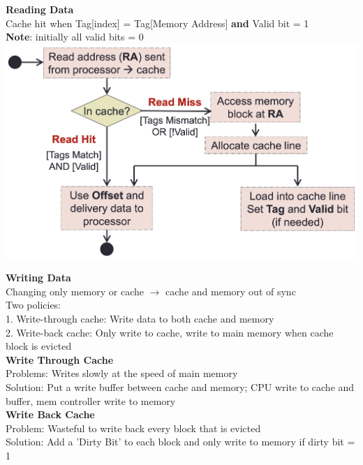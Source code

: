 \documentclass[10pt, a4paper]{article}
\newcommand{\highlight}[1]{{\color{red}\textbf{#1}}}
\newcommand{\red}[1]{{\color{red}#1}}
\newcommand{\green}[1]{{\color{ForestGreen}#1}}
\begin{document}
\begin{multicols*}{3}
		\textbf{Reading Data}\\
		Cache hit when Tag[index] = Tag[Memory Address] \highlight{and}
		Valid bit = 1\\
		\highlight{Note}: initially all valid bits = 0\\
		\includegraphics[scale=.22]{./assets/readCacheData}

		\textbf{Writing Data}\\
		Changing only memory or cache $\rightarrow$ cache and memory out of sync\\
		Two policies:\\
		1. Write-through cache: Write data to both cache and memory\\
		2. Write-back cache: Only write to cache, write to main memory when cache block is evicted\\

		\textbf{Write Through Cache}\\
		\red{Problems}: Writes slowly at the speed of main memory\\
		\green{Solution}: Put a write buffer between cache and memory; CPU write to cache and buffer, mem controller write to memory\\
		\textbf{Write Back Cache}\\
		\red{Problem}: Wasteful to write back every block that is evicted\\
		\green{Solution}: Add a 'Dirty Bit' to each block and only write to memory if dirty bit = 1\\


\end{multicols*}
\end{document}
